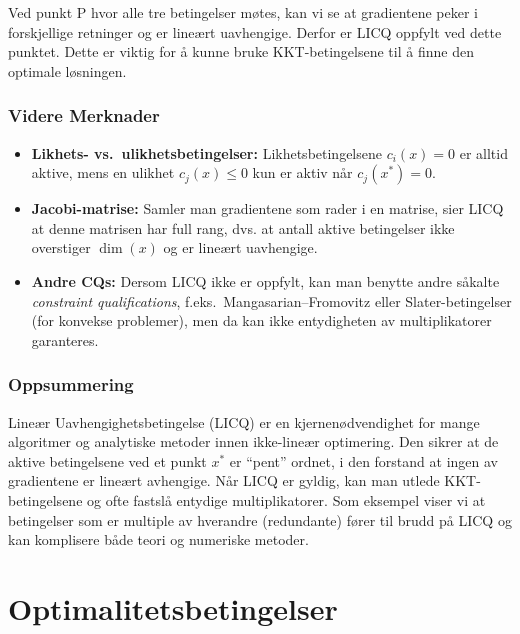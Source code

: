 Ved punkt P hvor alle tre betingelser møtes, kan vi se at gradientene peker i forskjellige retninger og er lineært uavhengige. Derfor er LICQ oppfylt ved dette punktet. Dette er viktig for å kunne bruke KKT-betingelsene til å finne den optimale løsningen.
\subsection{Videre Merknader}

\begin{itemize}
	\item \textbf{Likhets- vs.\ ulikhetsbetingelser:} Likhetsbetingelsene \(c_i(x)=0\) er alltid aktive, mens en ulikhet \(c_j(x)\le 0\) kun er aktiv når \(c_j(x^*)=0\).
	\item \textbf{Jacobi-matrise:} Samler man gradientene som rader i en matrise, sier LICQ at denne matrisen har full rang, dvs. at antall aktive betingelser ikke overstiger \(\dim(x)\) og er lineært uavhengige.
	\item \textbf{Andre CQs:} Dersom LICQ ikke er oppfylt, kan man benytte andre såkalte \emph{constraint qualifications}, f.eks.\ Mangasarian--Fromovitz eller Slater-betingelser (for konvekse problemer), men da kan ikke entydigheten av multiplikatorer garanteres.
\end{itemize}

\subsection{Oppsummering}

Lineær Uavhengighetsbetingelse (LICQ) er en kjernenødvendighet for mange algoritmer og analytiske metoder innen ikke-lineær optimering. Den sikrer at de aktive betingelsene ved et punkt \(x^*\) er ``pent'' ordnet, i den forstand at ingen av gradientene er lineært avhengige. Når LICQ er gyldig, kan man utlede KKT-betingelsene og ofte fastslå entydige multiplikatorer. Som eksempel viser vi at betingelser som er multiple av hverandre (redundante) fører til brudd på LICQ og kan komplisere både teori og numeriske metoder.

\chapter{Optimalitetsbetingelser}

